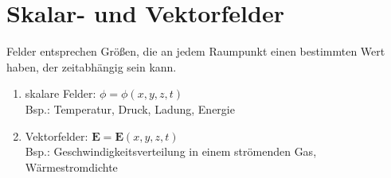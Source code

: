 \section{Skalar- und Vektorfelder}
Felder entsprechen Größen, die an jedem Raumpunkt einen bestimmten Wert haben, der zeitabhängig sein kann.\\
\begin{enumerate}
\item skalare Felder: $\phi=\phi(x,y,z,t)$\\ \linebreak
Bsp.: Temperatur, Druck, Ladung, Energie
\item Vektorfelder: $\bm{E}=\bm{E}(x,y,z,t)$\\ \linebreak
Bsp.: Geschwindigkeitsverteilung in einem strömenden Gas, Wärmestromdichte
\end{enumerate}
